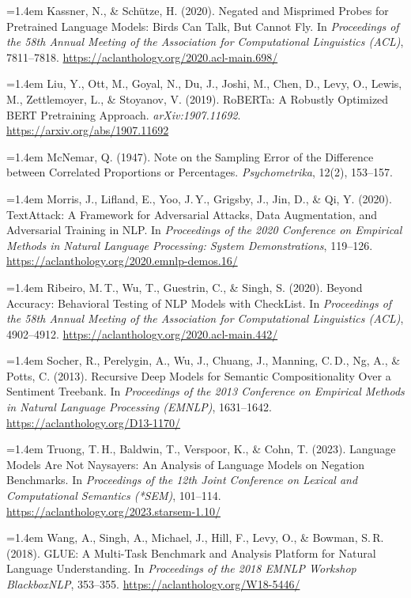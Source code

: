 \documentclass[11pt,a4paper]{article}
\newcommand{\refitem}[1]{\par\noindent\hangindent=1.4em\hangafter=1 #1\par\vspace{0.45em}}
\begin{document}
\refitem{Kassner, N., \& Sch\"utze, H. (2020). Negated and Misprimed Probes for Pretrained Language Models: Birds Can Talk, But Cannot Fly. In \emph{Proceedings of the 58th Annual Meeting of the Association for Computational Linguistics (ACL)}, 7811--7818. \url{https://aclanthology.org/2020.acl-main.698/}}

\refitem{Liu, Y., Ott, M., Goyal, N., Du, J., Joshi, M., Chen, D., Levy, O., Lewis, M., Zettlemoyer, L., \& Stoyanov, V. (2019). RoBERTa: A Robustly Optimized BERT Pretraining Approach. \emph{arXiv:1907.11692}. \url{https://arxiv.org/abs/1907.11692}}

\refitem{McNemar, Q. (1947). Note on the Sampling Error of the Difference between Correlated Proportions or Percentages. \emph{Psychometrika}, 12(2), 153--157.}

\refitem{Morris, J., Lifland, E., Yoo, J.\,Y., Grigsby, J., Jin, D., \& Qi, Y. (2020). TextAttack: A Framework for Adversarial Attacks, Data Augmentation, and Adversarial Training in NLP. In \emph{Proceedings of the 2020 Conference on Empirical Methods in Natural Language Processing: System Demonstrations}, 119--126. \url{https://aclanthology.org/2020.emnlp-demos.16/}}

\refitem{Ribeiro, M.\,T., Wu, T., Guestrin, C., \& Singh, S. (2020). Beyond Accuracy: Behavioral Testing of NLP Models with CheckList. In \emph{Proceedings of the 58th Annual Meeting of the Association for Computational Linguistics (ACL)}, 4902--4912. \url{https://aclanthology.org/2020.acl-main.442/}}

\refitem{Socher, R., Perelygin, A., Wu, J., Chuang, J., Manning, C.\,D., Ng, A., \& Potts, C. (2013). Recursive Deep Models for Semantic Compositionality Over a Sentiment Treebank. In \emph{Proceedings of the 2013 Conference on Empirical Methods in Natural Language Processing (EMNLP)}, 1631--1642. \url{https://aclanthology.org/D13-1170/}}

\refitem{Truong, T.\,H., Baldwin, T., Verspoor, K., \& Cohn, T. (2023). Language Models Are Not Naysayers: An Analysis of Language Models on Negation Benchmarks. In \emph{Proceedings of the 12th Joint Conference on Lexical and Computational Semantics (*SEM)}, 101--114. \url{https://aclanthology.org/2023.starsem-1.10/}}

\refitem{Wang, A., Singh, A., Michael, J., Hill, F., Levy, O., \& Bowman, S.\,R. (2018). GLUE: A Multi-Task Benchmark and Analysis Platform for Natural Language Understanding. In \emph{Proceedings of the 2018 EMNLP Workshop BlackboxNLP}, 353--355. \url{https://aclanthology.org/W18-5446/}}
\end{document}
